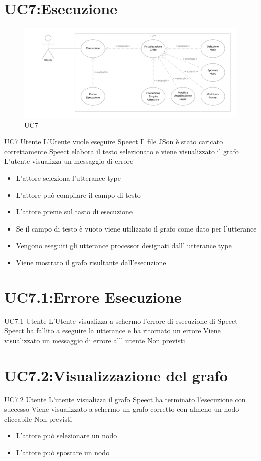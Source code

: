 \documentclass[../AnalisideiRequisiti.tex]{subfiles}
\begin{document}
\section{UC7:Esecuzione}
\begin{figure}[H]
	\caption{UC7}
	\centering
	\includegraphics[width=\textwidth]{../img/UC07.png}
\end{figure}
\UserCase
{UC7}
{Utente}
{}
{L'Utente vuole eseguire Speect}
{Il file JSon è stato caricato correttamente}
{Speect elabora il testo selezionato e viene visualizzato il grafo}
{L'utente visualizza un messaggio di errore }
{\begin{itemize}
		\item{} L'attore seleziona l'utterance type
		\item{} L'attore può compilare il campo di testo
		\item{} L'attore preme sul tasto di esecuzione
		\item{} Se il campo di testo è vuoto viene utilizzato il grafo come dato per l'utterance
		\item{} Vengono eseguiti gli utterance processor designati dall' utterance type
		\item{} Viene mostrato il grafo risultante dall'esecuzione 
	\end{itemize}
}

\section{UC7.1:Errore Esecuzione}
\UserCase
{UC7.1}
{Utente}
{}
{L'Utente visualizza a schermo l'errore di esecuzione di Speect }
{Speect ha fallito a eseguire la utterance e ha ritornato un errore}
{Viene visualizzato un messaggio di errore all' utente}
{Non previsti}
{}
\section{UC7.2:Visualizzazione del grafo}
\UserCase
{UC7.2}
{Utente}
{}
{L'utente visualizza il grafo}
{Speect ha terminato l'esecuzione con successo}
{Viene visualizzato a schermo un grafo corretto con almeno un nodo cliccabile}
{Non previsti}
{
	\begin{itemize}
		\item{} L'attore può selezionare un nodo 
		\item{} L'attore può spostare un nodo 
	\end{itemize}
}
\end{document}
